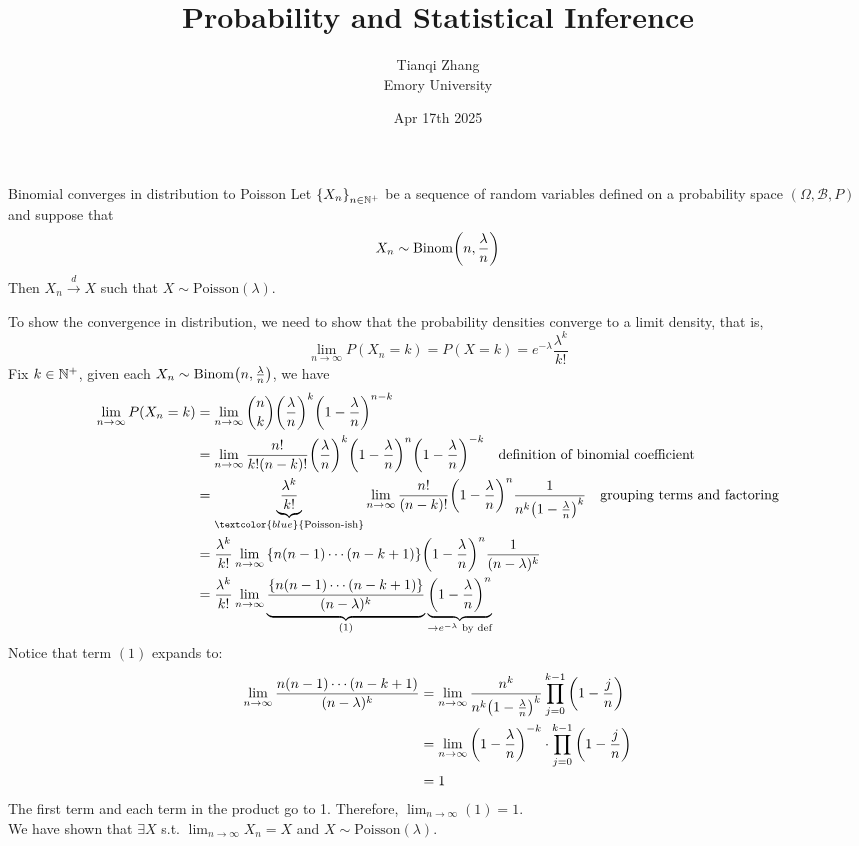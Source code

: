 

\title{\textbf{%
               Probability and Statistical Inference}}
\author{Tianqi Zhang\\
Emory University}
\date{Apr 17th 2025}


\maketitle
\setcounter{tocdepth}{1} %


\begin{thm}{Binomial converges in distribution to Poisson}
Let $\qty{X_n}_{n\in \mathbb{N}^+}$ be a sequence of random variables defined on a probability space $(\Omega, \mathcal{B}, P)$ and suppose that
$$X_n\sim \mathrm{Binom}\qty(n, \frac{\lambda}{n})$$
Then $X_n\xrightarrow{d} X$ such that $X\sim \mathrm{Poisson}(\lambda)$. 
\end{thm}

\begin{prf*}
To show the convergence in distribution, we need to show that the probability densities converge to a limit density, that is, 
$$\lim_{n\to\infty} P(X_n=k) = P(X=k) = e^{-\lambda}\frac{\lambda^{k}}{k!}$$
Fix $k\in \mathbb{N}^+$, given each $X_n\sim\mathrm{Binom}\qty(n, \frac{\lambda}{n})$, we have
\begin{align*}
	\lim_{n\to\infty} P(X_n = k) &= \lim_{n\to\infty}\binom{n}{k} \qty(\frac{\lambda}{n})^{k}\qty(1-\frac{\lambda}{n})^{n-k}\\
	&= \lim_{n\to\infty}\frac{n!}{k!(n-k)!}\qty(\frac{\lambda}{n})^{k}\qty(1-\frac{\lambda}{n})^{n}\qty(1-\frac{\lambda}{n})^{-k} \quad \text{definition of binomial coefficient}\\
	&= \underbrace{\frac{\lambda^k}{k!}}_{\textcolor{blue}{\text{Poisson-ish}}}\lim_{n\to\infty}\frac{n!}{(n-k)!}\qty(1-\frac{\lambda}{n})^{n}\frac{1}{n^k\qty(1-\frac{\lambda}{n})^k} \quad \text{grouping terms and factoring}\\
	&= \frac{\lambda^k}{k!}\lim_{n\to\infty}\qty{n(n-1)\cdots(n-k+1)}\qty(1-\frac{\lambda}{n})^{n}\frac{1}{(n-\lambda)^k}\\
	&= \frac{\lambda^k}{k!}\lim_{n\to\infty}\underbrace{\frac{\qty{n(n-1)\cdots(n-k+1)}}{(n-\lambda)^k}}_{(1)}\underbrace{\qty(1-\frac{\lambda}{n})^{n}}_{\rightarrow e^{-\lambda} \text{ by def}}
\end{align*}
Notice that term $(1)$ expands to: 
\begin{align*}
	\lim_{n\to\infty} \frac{n(n-1)\cdots(n-k+1)}{(n-\lambda)^k} &= \lim_{n\to\infty} \frac{n^k}{n^k \qty(1 - \frac{\lambda}{n})^k} \prod_{j=0}^{k-1} \qty(1 - \frac{j}{n})\\
	&= \lim_{n\to\infty} \qty(1-\frac{\lambda}{n})^{-k}\cdot \prod_{j=0}^{k-1} \qty(1 - \frac{j}{n})\\
	&= 1
\end{align*}
The first term and each term in the product go to 1. Therefore, $\lim_{n\to\infty}(1) = 1$.\\

\noindent We have shown that $\exists X$ s.t. $\lim_{n\to\infty} X_n = X$ and $X\sim \mathrm{Poisson}(\lambda)$. 
\end{prf*}


